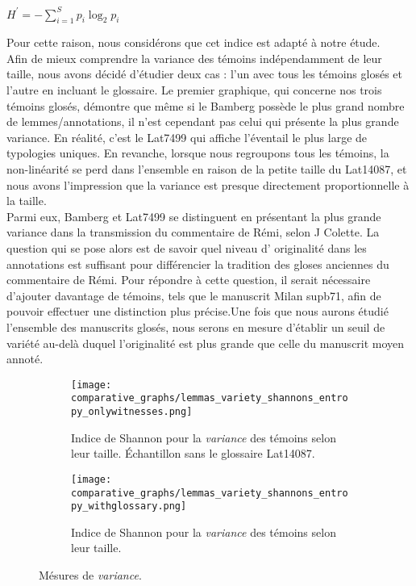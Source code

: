 \documentclass[a4paper, twoside, 12pt]{book}
\begin{document}
{\begin{math}
    {\displaystyle H^{\prime }=-\sum _{i=1}^{S}p_{i}\log _{2}p_{i}}
\end{math}

Pour cette raison, nous considérons que cet indice est adapté à notre étude. \\

Afin de mieux comprendre la variance des témoins indépendamment de leur taille, nous avons décidé d'étudier deux cas : l'un avec tous les témoins glosés et l'autre en incluant le glossaire. Le premier graphique, qui concerne nos trois témoins glosés, démontre que même si le Bamberg possède le plus grand nombre de lemmes/annotations, il n'est cependant pas celui qui présente la plus grande variance. En réalité, c'est le Lat7499 qui affiche l'éventail le plus large de typologies uniques. En revanche, lorsque nous regroupons tous les témoins, la non-linéarité se perd dans l'ensemble en raison de la petite taille du Lat14087, et nous avons l'impression que la variance est presque directement proportionnelle à la taille. \\

Parmi eux, Bamberg et Lat7499 se distinguent en présentant la plus grande variance dans la transmission du commentaire de Rémi, selon J Colette. La question qui se pose alors est de savoir quel niveau d' \og{}originalité\fg{} dans les annotations est suffisant pour différencier la tradition des gloses anciennes du commentaire de Rémi. Pour répondre à cette question, il serait nécessaire d'ajouter davantage de témoins, tels que le manuscrit Milan supb71, afin de pouvoir effectuer une distinction plus précise.Une fois que nous aurons étudié l'ensemble des manuscrits glosés, nous serons en mesure d'établir un seuil de \og{}variété\fg{} au-delà duquel l'originalité est plus grande que celle du manuscrit moyen annoté. 

\begin{figure}[H]
    \centering
    \begin{subfigure}{0.45\textwidth}
        \texttt{[image: comparative\_graphs/lemmas\_variety\_shannons\_entropy\_onlywitnesses.png]}
        \caption{Indice de Shannon pour la \textit{variance} des témoins selon leur taille. Échantillon sans le glossaire Lat14087.}
    \end{subfigure}
    \hfill %
    \begin{subfigure}{0.45\textwidth}
        \texttt{[image: comparative\_graphs/lemmas\_variety\_shannons\_entropy\_withglossary.png]}
        \caption{Indice de Shannon pour la \textit{variance} des témoins selon leur taille.}
    \end{subfigure}
    \caption{Mésures de \textit{variance}.}
    \label{fig:variance}
\end{figure}
  

}
\end{document}
